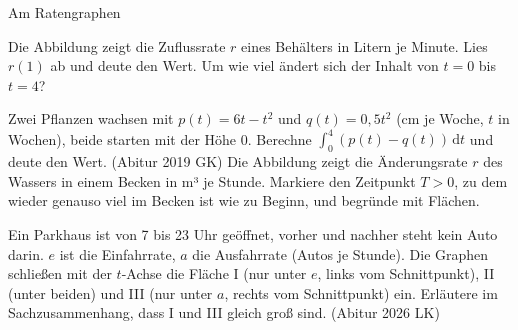 \setcounter{aufgabe}{13}

\begin{aufgabe}{Am Ratengraphen}
\begin{teile}
\teil Die Abbildung zeigt die Zuflussrate $r$ eines Behälters in Litern je Minute. Lies $r(1)$ ab und deute den Wert. Um wie viel ändert sich der Inhalt von $t = 0$ bis $t = 4$?

\begin{ksys}[xmin=0,xmax=7,ymin=-3,ymax=5,xlabel=t,ylabel=r,ablesen]  \end{ksys}
\teil Zwei Pflanzen wachsen mit $p(t) = 6t - t^2$ und $q(t) = 0{,}5t^2$ (cm je Woche, $t$ in Wochen), beide starten mit der Höhe 0. Berechne $∫_0^4 (p(t) - q(t))\,\mathrm{d}t$ und deute den Wert. \hfill (Abitur 2019 GK)
\teil Die Abbildung zeigt die Änderungsrate $r$ des Wassers in einem Becken in m³ je Stunde. Markiere den Zeitpunkt $T > 0$, zu dem wieder genauso viel im Becken ist wie zu Beginn, und begründe mit Flächen.

\begin{ksys}[xmin=0,xmax=8,ymin=-4,ymax=4,xlabel=t,ylabel=r,ablesen]  \end{ksys}
\teil Ein Parkhaus ist von 7 bis 23 Uhr geöffnet, vorher und nachher steht kein Auto darin. $e$ ist die Einfahrrate, $a$ die Ausfahrrate (Autos je Stunde). Die Graphen schließen mit der $t$-Achse die Fläche I (nur unter $e$, links vom Schnittpunkt), II (unter beiden) und III (nur unter $a$, rechts vom Schnittpunkt) ein. Erläutere im Sachzusammenhang, dass I und III gleich groß sind. \hfill (Abitur 2026 LK)
\end{teile}
\end{aufgabe}


